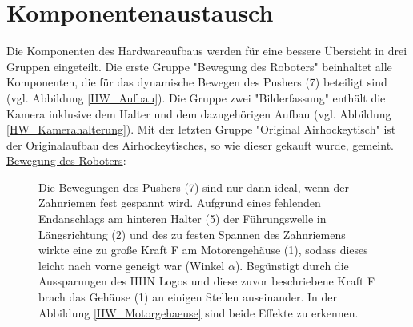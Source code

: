 \section{Komponentenaustausch}
\label{sect:Komponentenaustausch}
Die Komponenten des Hardwareaufbaus werden für eine bessere Übersicht in drei Gruppen eingeteilt. Die erste Gruppe "Bewegung des Roboters" beinhaltet alle Komponenten, die für das dynamische Bewegen des Pushers (7) beteiligt sind (vgl. Abbildung \ref{HW_Aufbau}). Die Gruppe zwei "Bilderfassung" enthält die Kamera inklusive dem Halter und dem dazugehörigen Aufbau (vgl. Abbildung \ref{HW_Kamerahalterung}). Mit der letzten Gruppe "Original Airhockeytisch" ist der Originalaufbau des Airhockeytisches, so wie dieser gekauft wurde, gemeint.\\

\underline{Bewegung des Roboters}:
\begin{figure} [h]
\begin{minipage}[t]{\textwidth}
\vspace{0pt}
Die Bewegungen des Pushers (7) sind nur dann ideal, wenn der Zahnriemen fest gespannt wird. Aufgrund eines fehlenden Endanschlags am hinteren Halter (5) der Führungswelle in Längsrichtung (2) und des zu festen Spannen des Zahnriemens wirkte eine zu große Kraft F am Motorengehäuse (1), sodass dieses leicht nach vorne geneigt war (Winkel $\alpha$). Begünstigt durch die Aussparungen des HHN Logos und diese zuvor beschriebene Kraft F brach das Gehäuse (1) an einigen Stellen auseinander. In der Abbildung \ref{HW_Motorgehaeuse} sind beide Effekte zu erkennen.\\
\end{minipage}
\end{figure}

